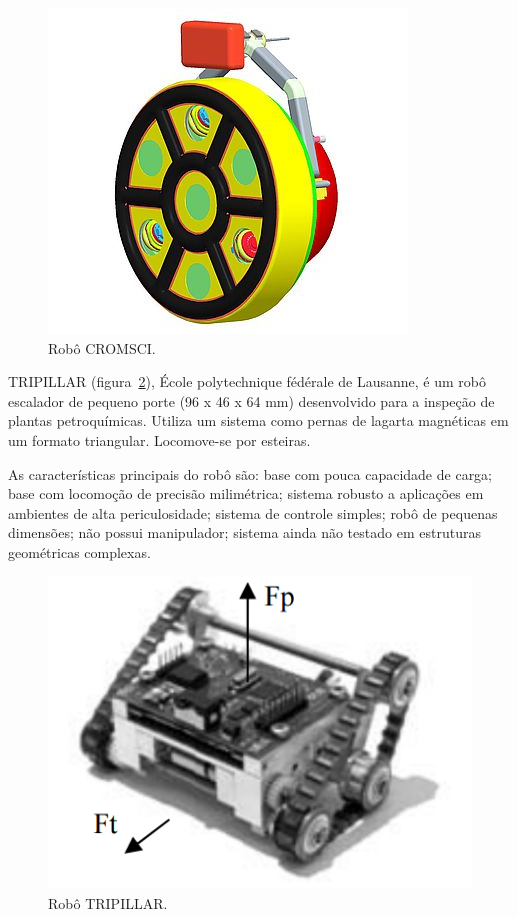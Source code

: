 \begin{figure}[ht]
\centering
\includegraphics[width=\columnwidth]{sota/figs/climbers/cromsci.jpg}
\caption{Robô CROMSCI.}
\label{cromsci}
\end{figure}

TRIPILLAR (figura~\ref{tripillar}), École polytechnique fédérale de Lausanne, é
um robô escalador de pequeno porte (96 x 46 x 64 mm) desenvolvido para a inspeção de plantas
petroquímicas. Utiliza um sistema como pernas de lagarta magnéticas em um
formato triangular. Locomove-se por esteiras.

As características principais do robô são: base com pouca capacidade de
carga; base com locomoção de precisão milimétrica; sistema robusto a aplicações
em ambientes de alta periculosidade; sistema de controle simples; robô de
pequenas dimensões; não possui manipulador; sistema ainda não testado em estruturas geométricas complexas.


\begin{figure}[ht]
\centering
\includegraphics[width=\columnwidth]{sota/figs/climbers/tripillar.png}
\caption{Robô TRIPILLAR.}
\label{tripillar}
\end{figure}
   
